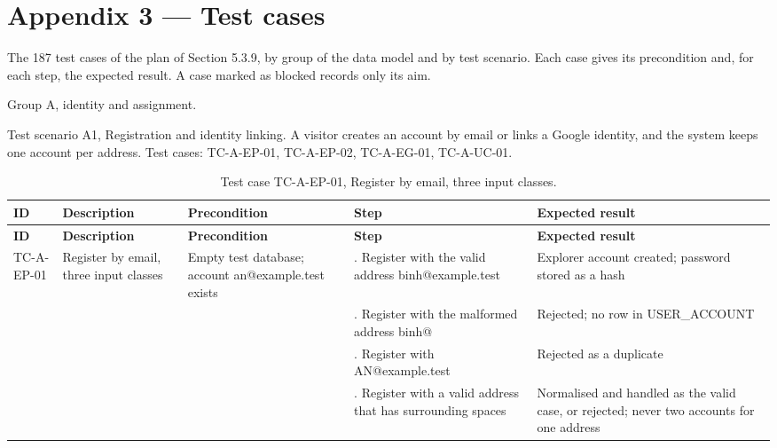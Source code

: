 \newpage
\section*{Appendix 3 --- Test cases}

The 187 test cases of the plan of Section 5.3.9, by group of the data model and by test scenario. Each case gives its precondition and, for each step, the expected result. A case marked as blocked records only its aim.

Group A, identity and assignment.

Test scenario A1, Registration and identity linking. A visitor creates an account by email or links a Google identity, and the system keeps one account per address. Test cases: TC-A-EP-01, TC-A-EP-02, TC-A-EG-01, TC-A-UC-01.

{\small
\begin{longtable}{|>{\raggedright\arraybackslash}p{}|>{\raggedright\arraybackslash}p{}|>{\raggedright\arraybackslash}p{}|>{\raggedright\arraybackslash}p{}|>{\raggedright\arraybackslash}p{}|}
\caption{Test case TC-A-EP-01, Register by email, three input classes.} \\
\hline
\textbf{ID} & \textbf{Description} & \textbf{Precondition} & \textbf{Step} & \textbf{Expected result} \\ \hline
\endfirsthead
\hline
\textbf{ID} & \textbf{Description} & \textbf{Precondition} & \textbf{Step} & \textbf{Expected result} \\ \hline
\endhead
TC-A-EP-01 & Register by email, three input classes & Empty test database; account an@example.test exists & 1. Register with the valid address binh@example.test & Explorer account created; password stored as a hash \\ \hline
 &  &  & 2. Register with the malformed address binh@ & Rejected; no row in USER\_ACCOUNT \\ \hline
 &  &  & 3. Register with AN@example.test & Rejected as a duplicate \\ \hline
 &  &  & 4. Register with a valid address that has surrounding spaces & Normalised and handled as the valid case, or rejected; never two accounts for one address \\ \hline
\end{longtable}
}

